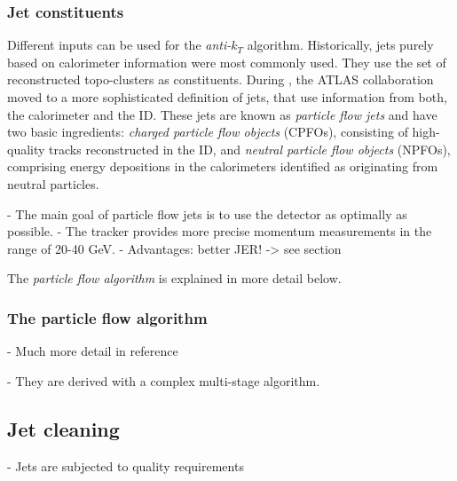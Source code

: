 \subsubsection{Jet constituents}
Different inputs can be used for the \emph{anti-$k_T$} algorithm. 
Historically, jets purely based on calorimeter information were most commonly used. They use the set of reconstructed topo-clusters as constituents.
During \RunTwo, the ATLAS collaboration moved to a more sophisticated definition of jets, that use information from both, the calorimeter and the ID. These jets are known as \emph{particle flow jets} and have two basic ingredients: \emph{charged particle flow objects} (CPFOs), consisting of high-quality tracks reconstructed in the ID, and \emph{neutral particle flow objects} (NPFOs), comprising energy depositions in the calorimeters identified as originating from neutral particles.

- The main goal of particle flow jets is to use the detector as optimally as possible. 
- The tracker provides more precise momentum measurements in the range of 20-40 GeV. 
- Advantages: better JER! -> see section

The \emph{particle flow algorithm} is explained in more detail below.

\subsubsection{The particle flow algorithm}
- Much more detail in reference

- They are derived with a complex multi-stage algorithm. 

\subsection{Jet cleaning}

- Jets are subjected to quality requirements 



